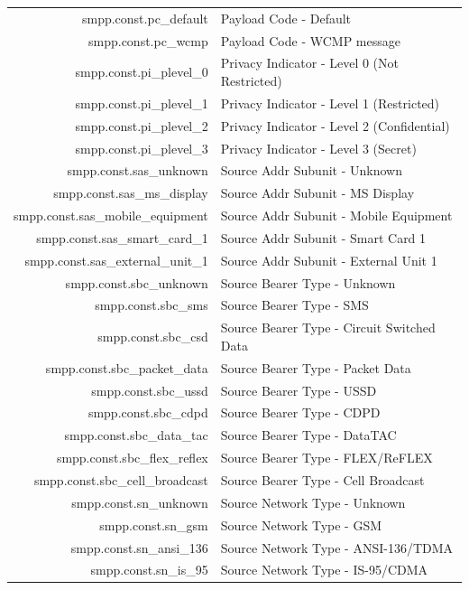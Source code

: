 \documentclass[a4paper,latin]{paper}
\begin{document}
\noindent\begin{tabularx}{\linewidth}{ | >{\ttfamily} r | >{\ttfamily} X |}
	\hline
	smpp.const.pc\_default				& Payload Code - Default\\
	smpp.const.pc\_wcmp				& Payload Code - WCMP message\\
	smpp.const.pi\_plevel\_0			& Privacy Indicator - Level 0 (Not Restricted)\\
	smpp.const.pi\_plevel\_1			& Privacy Indicator - Level 1 (Restricted)\\
	smpp.const.pi\_plevel\_2			& Privacy Indicator - Level 2 (Confidential)\\
	smpp.const.pi\_plevel\_3			& Privacy Indicator - Level 3 (Secret)\\
	smpp.const.sas\_unknown				& Source Addr Subunit - Unknown\\
	smpp.const.sas\_ms\_display			& Source Addr Subunit - MS Display\\
	smpp.const.sas\_mobile\_equipment		& Source Addr Subunit - Mobile Equipment\\
	smpp.const.sas\_smart\_card\_1			& Source Addr Subunit - Smart Card 1\\
	smpp.const.sas\_external\_unit\_1		& Source Addr Subunit - External Unit 1\\
	smpp.const.sbc\_unknown				& Source Bearer Type - Unknown\\
	smpp.const.sbc\_sms				& Source Bearer Type - SMS\\
	smpp.const.sbc\_csd				& Source Bearer Type - Circuit Switched Data\\
	smpp.const.sbc\_packet\_data			& Source Bearer Type - Packet Data\\
	smpp.const.sbc\_ussd				& Source Bearer Type - USSD\\
	smpp.const.sbc\_cdpd				& Source Bearer Type - CDPD\\
	smpp.const.sbc\_data\_tac			& Source Bearer Type - DataTAC\\
	smpp.const.sbc\_flex\_reflex			& Source Bearer Type - FLEX/ReFLEX\\
	smpp.const.sbc\_cell\_broadcast			& Source Bearer Type - Cell Broadcast\\
	smpp.const.sn\_unknown				& Source Network Type - Unknown\\
	smpp.const.sn\_gsm				& Source Network Type - GSM\\
	smpp.const.sn\_ansi\_136			& Source Network Type - ANSI-136/TDMA\\
	smpp.const.sn\_is\_95				& Source Network Type - IS-95/CDMA\\

\end{tabularx}
\end{document}

